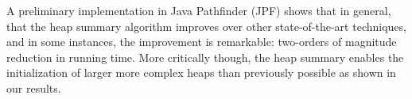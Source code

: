 
A preliminary implementation in Java Pathfinder (JPF) shows that in
general, that the heap summary algorithm improves over other
state-of-the-art techniques, and in some instances, the improvement is
remarkable: two-orders of magnitude reduction in running time. More
critically though, the heap summary enables the initialization of
larger more complex heaps than previously possible as shown in our
results.



\begin{comment}
We implement the summary heap algorithm as an extension to \emph{Java
  PathFinder} (JPF) and compare it to GSE with lazy initialization in
\emph{Symbolic Pathfinder (SPF)} and an implementation of lazier\#
initialization in SPF.  The comparison shows on some examples up to a two-order of magnitude
reduction in the total time taken to explore the same state space
defined by the bound on the longest heap reference chain.  For these
examples, we show that where other GSE approaches are unable to
complete exploration within the provided time bound, the summary heap
finishes exploration in a few seconds.
\end{comment}





